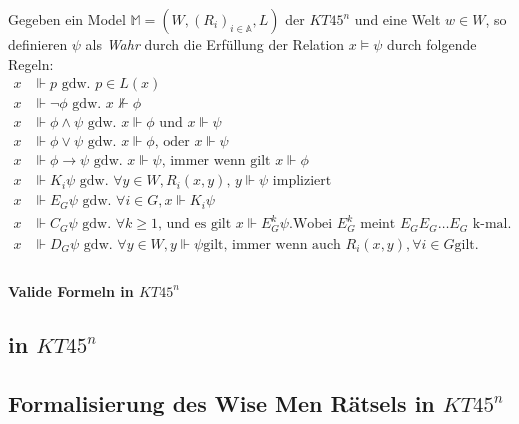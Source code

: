 







\begin{definition}
		Gegeben ein Model $\mathds{M} = (W,(R_i)_{i \in \mathds{A}}, L)$ der $KT45^n$ und eine Welt $w \in W$, so definieren $\psi$ als \emph{Wahr} durch die Erfüllung der Relation $x \vDash \psi$ durch folgende Regeln:
		\begin{align}
			x &\Vdash p\text{ gdw. }p \in L(x)\\
			x &\Vdash \neg \phi\text{ gdw. }x \nVdash \phi\\
			x &\Vdash \phi \wedge \psi\text{ gdw. }x \Vdash \phi\text{ und } x \Vdash \psi\\
			x &\Vdash \phi \vee \psi\text{ gdw. }x \Vdash \phi \text{, oder } x \Vdash \psi\\
			x &\Vdash \phi \rightarrow \psi\text{ gdw. }x \Vdash \psi\text{, immer wenn gilt }x \Vdash \phi\\
			x &\Vdash K_i\psi \text{ gdw. } \forall y \in W, R_i(x,y) \text{, } y \Vdash \psi \text{ impliziert}\\
			x &\Vdash E_G\psi \text{ gdw. } \forall i \in G, x \Vdash K_i\psi\\
			x &\Vdash C_G\psi \text{ gdw. } \forall k \geq 1 \text{, und es gilt } x \Vdash E^k_G\psi \text{.} \text{Wobei } E^k_G \text{ meint } E_{G}E_{G}\dots E_{G} \text{ k-mal.}\\
			x &\Vdash D_G\psi \text{ gdw. } \forall y \in W, y \Vdash \psi \text{gilt, immer wenn auch } R_i(x,y), \forall i \in G \text{gilt.}\\
		\end{align}
		\cite[S.337]{huth2004logic}
\end{definition}


\paragraph{Valide Formeln in $KT45^n$}



\subsection{\ND in $KT45^n$}

\subsection{Formalisierung des Wise Men Rätsels in $KT45^n$}










